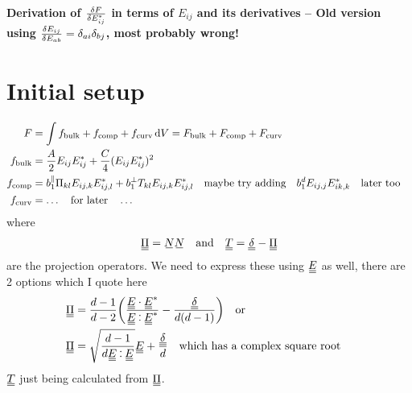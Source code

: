 \documentclass{article}
\newcommand\barbelow[1]{\stackunder[1.2pt]{$#1$}{\rule{1.5ex}{.1ex}}}
\newcommand{\su}[1]{\barbelow{#1}}
\newcommand{\du}[1]{\barbelow{\barbelow{#1}}}
\def\onedot{$\mathsurround0pt\ldotp$}
\def\cddot{\mathbin{
    \vcenter{\baselineskip1ex \vspace{-0.1ex}\hbox{\onedot}\hbox{\onedot}}
}}
\begin{document}
\begin{center}
    \LARGE
    \textbf{Derivation of $\fdv{F}{E_{ij}^*}$ in terms of $E_{ij}$ and its derivatives -- Old version using $\fdv{E_{ij}}{E_{ab}} = \delta_{ai}\delta_{bj}$, most probably wrong!}
\end{center}
\vspace{1em}
\section{Initial setup}
\begin{align}
    F & = \int f_\text{bulk} + f_\text{comp} + f_\text{curv} \dd{V} = F_\text{bulk} + F_\text{comp} + F_\text{curv}\\
    f_\text{bulk} & = \frac{A}{2} E_{ij}E_{ij}^* + \frac{C}{4} (E_{ij}E_{ij}^*)^2 \\
    f_\text{comp} & = b_1^\parallel \Pi_{kl} E_{ij,k}E_{ij,l}^* + b_1^\perp T_{kl} E_{ij,k}E_{ij,l}^* \qq{maybe try adding} b_1^d E_{ij,j}E_{ik,k}^* \qq{later too} \\
    f_\text{curv} & = \ldots \qq{for later} \ldots \\
\end{align}
where
\begin{align}
    \du{\Pi} = \su{N} \su{N} && \text{and} && \du{T} = \du{\delta} - \du{\Pi}
\end{align}
are the projection operators. We need to express these using $\du{E}$ as well, there are 2 options which I quote here
\begin{align}
    \du{\Pi} & = \frac{d-1}{d-2}\qty(\frac{\du{E} \cdot \du{E}^*}{\du{E} \cddot \du{E}^*} - \frac{\du{\delta}}{d(d-1)}) \qq{or} \label{eq:piex1}\\
    \du{\Pi} & = \sqrt{\frac{d-1}{d \du{E} \cddot \du{E}}} \du{E} + \frac{\du{\delta}}{d} \label{eq:piex2} \qq{which has a complex square root}
\end{align}
$\du{T}$ just being calculated from $\du{\Pi}$.
\end{document}
